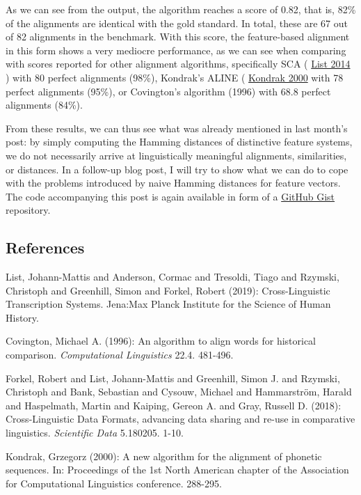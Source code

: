 \documentclass[
  a4paper,
  14pt,
  oneside,
  tablecaptionabove
]{scrbook}
\begin{document}
As we can see from the output, the algorithm reaches a score of 0.82,
that is, 82\% of the alignments are identical with the gold standard. In
total, these are 67 out of 82 alignments in the benchmark. With this
score, the feature-based alignment in this form shows a very mediocre
performance, as we can see when comparing with scores reported for other
alignment algorithms, specifically SCA (
\href{http://bibliography.lingpy.org?key=List2014d}{List 2014} ) with 80
perfect alignments (98\%), Kondrak's ALINE (
\href{http://bibliography.lingpy.org?key=Kondrak2000}{Kondrak 2000} with
78 perfect alignments (95\%), or Covington's algorithm (1996) with 68.8
perfect alignments (84\%).

From these results, we can thus see what was already mentioned in last
month's post: by simply computing the Hamming distances of distinctive
feature systems, we do not necessarily arrive at linguistically
meaningful alignments, similarities, or distances. In a follow-up blog
post, I will try to show what we can do to cope with the problems
introduced by naive Hamming distances for feature vectors. The code
accompanying this post is again available in form of a
\href{https://gist.github.com/LinguList/ce6da48112018365bccb94bcbec891b1}{GitHub
Gist} repository.

\subsection*{References}

\nopagebreak\hangindent=0.7cm {\small List, Johann-Mattis and Anderson, Cormac and Tresoldi, Tiago and
Rzymski, Christoph and Greenhill, Simon and Forkel, Robert (2019):
Cross-Linguistic Transcription Systems. Jena:Max Planck Institute for
the Science of Human History. }

\nopagebreak\hangindent=0.7cm {\small Covington, Michael A. (1996): An algorithm to align words for
historical comparison. \emph{Computational Linguistics} 22.4.
481-496. }

\nopagebreak\hangindent=0.7cm {\small Forkel, Robert and List, Johann-Mattis and Greenhill, Simon J. and
Rzymski, Christoph and Bank, Sebastian and Cysouw, Michael and
Hammarström, Harald and Haspelmath, Martin and Kaiping, Gereon A. and
Gray, Russell D. (2018): Cross-Linguistic Data Formats, advancing data
sharing and re-use in comparative linguistics. \emph{Scientific Data}
5.180205. 1-10. }

\nopagebreak\hangindent=0.7cm {\small Kondrak, Grzegorz (2000): A new algorithm for the alignment of
phonetic sequences. In: Proceedings of the 1st North American chapter of
the Association for Computational Linguistics conference. 288-295. }
\end{document}
